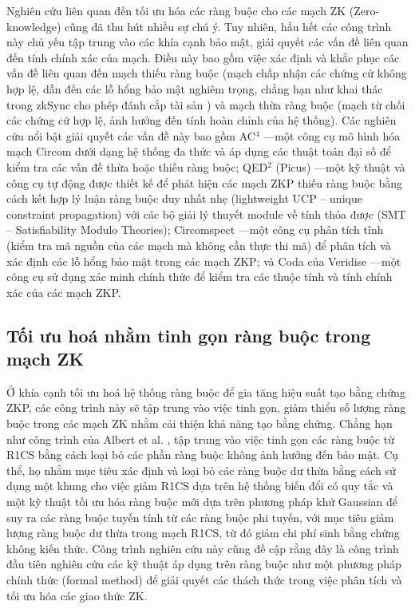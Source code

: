 Nghiên cứu liên quan đến tối ưu hóa các ràng buộc cho các mạch ZK (Zero-knowledge) cũng đã thu hút nhiều sự chú ý. Tuy nhiên, hầu hết các công trình này chủ yếu tập trung vào các khía cạnh bảo mật, giải quyết các vấn đề liên quan đến tính chính xác của mạch. Điều này bao gồm việc xác định và khắc phục các vấn đề liên quan đến mạch thiếu ràng buộc (mạch chấp nhận các chứng cứ không hợp lệ, dẫn đến các lỗ hổng bảo mật nghiêm trọng, chẳng hạn như khai thác trong zkSync cho phép đánh cắp tài sản \cite{tang2024zero}) và mạch thừa ràng buộc (mạch từ chối các chứng cứ hợp lệ, ảnh hưởng đến tính hoàn chỉnh của hệ thống). Các nghiên cứu nổi bật giải quyết các vấn đề này bao gồm AC$^4$ \cite{chen2024ac4}—một công cụ mô hình hóa mạch Circom dưới dạng hệ thống đa thức và áp dụng các thuật toán đại số để kiểm tra các vấn đề thừa hoặc thiếu ràng buộc; QED$^2$ (Picus) \cite{pailoor2023automated}—một kỹ thuật và công cụ tự động được thiết kế để phát hiện các mạch ZKP thiếu ràng buộc bằng cách kết hợp lý luận ràng buộc duy nhất nhẹ (lightweight UCP -- unique constraint propagation) với các bộ giải lý thuyết module về tính thỏa được (SMT -- Satisfiability Modulo Theories); Circomspect \cite{circomspect2022}—một công cụ phân tích tĩnh (kiểm tra mã nguồn của các mạch mà không cần thực thi mã) để phân tích và xác định các lỗ hổng bảo mật trong các mạch ZKP; và Coda của Veridise \cite{liu2024certifying}—một công cụ sử dụng xác minh chính thức để kiểm tra các thuộc tính và tính chính xác của các mạch ZKP.

\subsection{Tối ưu hoá nhằm tinh gọn ràng buộc trong mạch ZK}
Ở khía cạnh tối ưu hoá hệ thống ràng buộc để gia tăng hiệu suất tạo bằng chứng ZKP, các công trình này sẽ tập trung vào việc tinh gọn, giảm thiểu số lượng ràng buộc trong các mạch ZK nhằm cải thiện khả năng tạo bằng chứng. Chẳng hạn như công trình của Albert et al. \cite{albert2022distilling}, tập trung vào việc tinh gọn các ràng buộc từ R1CS bằng cách loại bỏ các phần ràng buộc không ảnh hưởng đến bảo mật. Cụ thể, họ nhằm mục tiêu xác định và loại bỏ các ràng buộc dư thừa bằng cách sử dụng một khung cho việc giảm R1CS dựa trên hệ thống biến đổi có quy tắc và một kỹ thuật tối ưu hóa ràng buộc mới dựa trên phương pháp khử Gaussian để suy ra các ràng buộc tuyến tính từ các ràng buộc phi tuyến, với mục tiêu giảm lượng ràng buộc dư thừa trong mạch R1CS, từ đó giảm chi phí sinh bằng chứng không kiến thức. Công trình nghiên cứu này cũng đề cập rằng đây là công trình đầu tiên nghiên cứu các kỹ thuật áp dụng trên ràng buộc như một phương pháp chính thức (formal method) để giải quyết các thách thức trong việc phân tích và tối ưu hóa các giao thức ZK.

